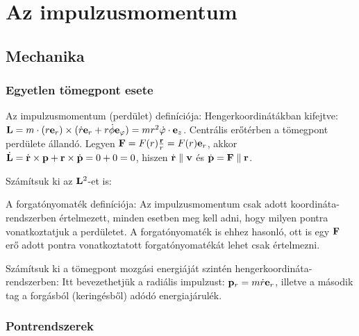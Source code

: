 \chapter{Az impulzusmomentum}

 \section{Mechanika}
  
  \subsection{Egyetlen tömegpont esete}
 
   Az impulzusmomentum (perdület) definíciója: 
   Hengerkoordinátákban kifejtve: $\mathbf{L}=m\cdot(r\mathbf{e}_r)\times(\dot{r}\mathbf{e}_r+r\dot{\phi}\mathbf{e}_\varphi)=mr^2\dot{\varphi}\cdot\mathbf{e}_z$. Centrális erőtérben a tömegpont perdülete állandó. Legyen $\mathbf{F}=F(r)\frac{\mathbf{r}}{r}=F(r)\mathbf{e}_r$, akkor $\dot{\mathbf{L}}=\dot{\mathbf{r}}\times\mathbf{p}+\mathbf{r}\times\dot{\mathbf{p}}=0+0=0$, hiszen $\dot{\mathbf{r}}\parallel \mathbf{v}$ és $\dot{\mathbf{p}}=\mathbf{F}\parallel\mathbf{r}$.
   
   Számítsuk ki az $\mathbf{L}^2$-et is:
   
   A forgatónyomaték definíciója:
   Az impulzusmomentum csak adott koordináta-rendszerben értelmezett, minden esetben meg kell adni, hogy milyen pontra vonatkoztatjuk a perdületet. A forgatónyomaték is ehhez hasonló, ott is egy $\mathbf{F}$ erő adott pontra vonatkoztatott forgatónyomatékát lehet csak értelmezni.
   
   Számítsuk ki a tömegpont mozgási energiáját szintén hengerkoordináta-rendszerben:
   Itt bevezethetjük a radiális impulzust: $\mathbf{p}_r=m\dot r\mathbf{e}_r$, illetve a második tag a forgásból (keringésből) adódó energiajárulék. 
  
  \subsection{Pontrendszerek}\label{ss6:pontrendszerek}
   
